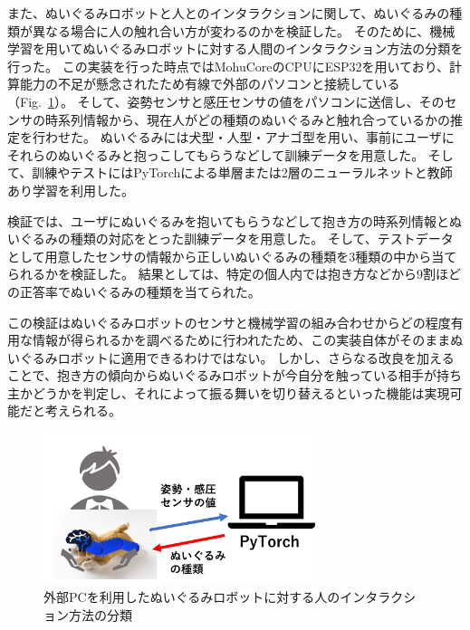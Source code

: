 \documentclass[uplatex,a4paper,12pt]{jsarticle}
\renewcommand{\figurename}{Fig.}
\newcommand{\figref}[1]{\figurename~\ref{#1}}
\begin{document}
また、ぬいぐるみロボットと人とのインタラクションに関して、ぬいぐるみの種類が異なる場合に人の触れ合い方が変わるのかを検証した。
そのために、機械学習を用いてぬいぐるみロボットに対する人間のインタラクション方法の分類を行った。
この実装を行った時点ではMohuCoreのCPUにESP32を用いており、計算能力の不足が懸念されたため有線で外部のパソコンと接続している（\figref{fig:learning}）。
そして、姿勢センサと感圧センサの値をパソコンに送信し、そのセンサの時系列情報から、現在人がどの種類のぬいぐるみと触れ合っているかの推定を行わせた。
ぬいぐるみには犬型・人型・アナゴ型を用い、事前にユーザにそれらのぬいぐるみと抱っこしてもらうなどして訓練データを用意した。
そして、訓練やテストにはPyTorchによる単層または2層のニューラルネットと教師あり学習を利用した。

検証では、ユーザにぬいぐるみを抱いてもらうなどして抱き方の時系列情報とぬいぐるみの種類の対応をとった訓練データを用意した。
そして、テストデータとして用意したセンサの情報から正しいぬいぐるみの種類を3種類の中から当てられるかを検証した。
結果としては、特定の個人内では抱き方などから9割ほどの正答率でぬいぐるみの種類を当てられた。

この検証はぬいぐるみロボットのセンサと機械学習の組み合わせからどの程度有用な情報が得られるかを調べるために行われたため、この実装自体がそのままぬいぐるみロボットに適用できるわけではない。
しかし、さらなる改良を加えることで、抱き方の傾向からぬいぐるみロボットが今自分を触っている相手が持ち主かどうかを判定し、それによって振る舞いを切り替えるといった機能は実現可能だと考えられる。


\begin{figure}[htbp]
  \centering
  \includegraphics[width=8cm]{images/mohutics/learning.png}
  \caption{外部PCを利用したぬいぐるみロボットに対する人のインタラクション方法の分類}
  \label{fig:learning}
\end{figure}
\end{document}
